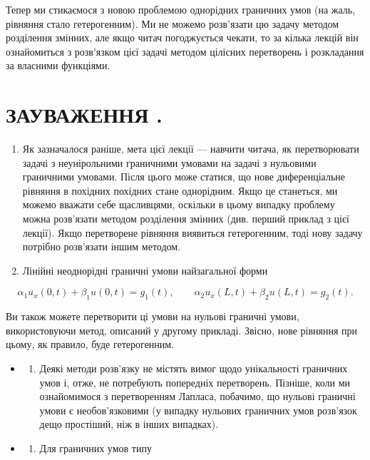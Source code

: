 \documentclass[
  ukrainian,
]{article}
\providecommand{\tightlist}{%
  \setlength{\itemsep}{0pt}\setlength{\parskip}{0pt}}
\begin{document}
Тепер ми стикаємося з новою проблемою однорідних граничних умов (на
жаль, рівняння стало гетерогенним). Ми не можемо розв'язати цю задачу
методом розділення змінних, але якщо читач погоджується чекати, то за
кілька лекцій він ознайомиться з розв'язком цієї задачі методом цілісних
перетворень і розкладання за власними функціями.

\section{ЗАУВАЖЕННЯ
.}\label{ux437ux430ux443ux432ux430ux436ux435ux43dux43dux44f-.}

\begin{enumerate}
\def\labelenumi{\arabic{enumi}.}
\item
  Як зазначалося раніше, мета цієї лекції --- навчити читача, як
  перетворювати задачі з неунірольними граничними умовами на задачі з
  нульовими граничними умовами. Після цього може статися, що нове
  диференціальне рівняння в похідних похідних стане однорідним. Якщо це
  станеться, ми можемо вважати себе щасливцями, оскільки в цьому випадку
  проблему можна розв'язати методом розділення змінних (див. перший
  приклад з цієї лекції). Якщо перетворене рівняння виявиться
  гетерогенним, тоді нову задачу потрібно розв'язати іншим методом.
\item
  Лінійні неоднорідні граничні умови найзагальної форми
\end{enumerate}

\[
\alpha_1 u_x(0,t) + \beta_1 u(0,t) = g_1(t), \qquad \alpha_2 u_x(L,t) + \beta_2 u(L,t) = g_2(t).
\]

Ви також можете перетворити ці умови на нульові граничні умови,
використовуючи метод, описаний у другому прикладі. Звісно, нове рівняння
при цьому, як правило, буде гетерогенним.

\begin{itemize}
\tightlist
\item
  \begin{enumerate}
  \def\labelenumi{\arabic{enumi}.}
  \setcounter{enumi}{2}
  \tightlist
  \item
    Деякі методи розв'язку не містять вимог щодо унікальності граничних
    умов і, отже, не потребують попередніх перетворень. Пізніше, коли ми
    ознайомимося з перетворенням Лапласа, побачимо, що нульові граничні
    умови є необов'язковими (у випадку нульових граничних умов розв'язок
    дещо простіший, ніж в інших випадках).
  \end{enumerate}
\item
  \begin{enumerate}
  \def\labelenumi{\arabic{enumi}.}
  \setcounter{enumi}{3}
  \tightlist
  \item
    Для граничних умов типу
  \end{enumerate}
\end{itemize}
\end{document}
